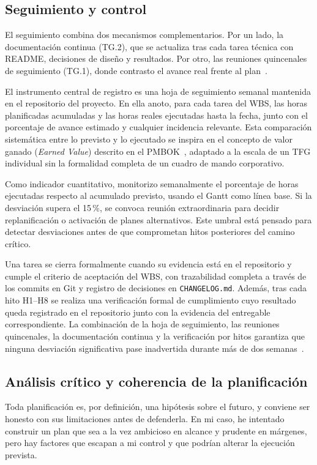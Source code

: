 \subsection{Seguimiento y control}

El seguimiento combina dos mecanismos complementarios. Por un lado, la documentación continua (TG.2), que se actualiza tras cada tarea técnica con README, decisiones de diseño y resultados. Por otro, las reuniones quincenales de seguimiento (TG.1), donde contrasto el avance real frente al plan~\cite{gep23}.

El instrumento central de registro es una hoja de seguimiento semanal mantenida en el repositorio del proyecto. En ella anoto, para cada tarea del WBS, las horas planificadas acumuladas y las horas reales ejecutadas hasta la fecha, junto con el porcentaje de avance estimado y cualquier incidencia relevante. Esta comparación sistemática entre lo previsto y lo ejecutado se inspira en el concepto de valor ganado (\textit{Earned Value}) descrito en el PMBOK~\cite{pmbok}, adaptado a la escala de un TFG individual sin la formalidad completa de un cuadro de mando corporativo.

Como indicador cuantitativo, monitorizo semanalmente el porcentaje de horas ejecutadas respecto al acumulado previsto, usando el Gantt como línea base. Si la desviación supera el 15\,\%, se convoca reunión extraordinaria para decidir replanificación o activación de planes alternativos. Este umbral está pensado para detectar desviaciones antes de que comprometan hitos posteriores del camino crítico.

Una tarea se cierra formalmente cuando su evidencia está en el repositorio y cumple el criterio de aceptación del WBS, con trazabilidad completa a través de los commits en Git y registro de decisiones en \texttt{CHANGELOG.md}. Además, tras cada hito H1--H8 se realiza una verificación formal de cumplimiento cuyo resultado queda registrado en el repositorio junto con la evidencia del entregable correspondiente. La combinación de la hoja de seguimiento, las reuniones quincenales, la documentación continua y la verificación por hitos garantiza que ninguna desviación significativa pase inadvertida durante más de dos semanas~\cite{gep23}.

\subsection{Análisis crítico y coherencia de la planificación}

Toda planificación es, por definición, una hipótesis sobre el futuro, y conviene ser honesto con sus limitaciones antes de defenderla. En mi caso, he intentado construir un plan que sea a la vez ambicioso en alcance y prudente en márgenes, pero hay factores que escapan a mi control y que podrían alterar la ejecución prevista.

